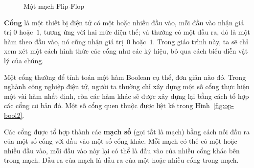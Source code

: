 \begin{figure}[tbh]  
\centering
\caption{Một mạch Flip-Flop}
 \label{fig:op-flipflop}
\end{figure}
 

\textbf{Cổng} là một thiết bị điện tử có một hoặc nhiều đầu vào, mỗi đầu vào nhận giá trị
$0$ hoặc~$1$, tương ứng với hai mức điện thế; và thường có một đầu ra, đó là một hàm theo
đầu vào, nó cũng nhận giá trị~$0$ hoặc~$1$.  Trong giáo trình này, ta sẽ chỉ xem xét một
cách hình thức các cổng như các ký hiệu, bỏ qua cách biểu diễn vật lý của chúng.

Một cổng thường để tính toán một hàm Boolean cụ thể, đơn giản nào đó. Trong nghành công
nghiệp điện tử, người ta thường chỉ xây dựng một số cổng thực hiện một vài hàm nhất định,
còn các hàm khác sẽ được xây dựng lại bằng cách tổ hợp các cổng cơ bản đó.  Một số cổng
quen thuộc được liệt kê trong Hình~\ref{fig:op-bool2}.

 
Các cổng được tổ hợp thành các \textbf{mạch số} (gọi tắt là mạch) bằng cách nối đầu ra của
một số cổng với đầu vào một số cổng khác. Mỗi mạch có thể có một hoặc nhiều đầu vào, mỗi
đầu vào này lại có thể là đầu vào của nhiều cổng khác bên trong mạch. Đầu ra của mạch là đầu ra của một hoặc
nhiều cổng trong mạch.

